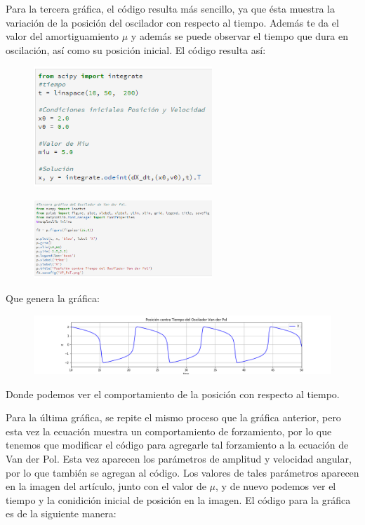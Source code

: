 \documentclass[a4paper]{article}
\begin{document}
\bigskip


Para la tercera gráfica, el código resulta más sencillo, ya que ésta muestra la variación de la posición del oscilador con respecto al tiempo. Además te da el valor del amortiguamiento $\mu$ y además se puede observar el tiempo que dura en oscilación, así como su posición inicial. El código resulta así:

\begin{figure}[ht!]
 \centering
  \includegraphics[width=0.6\textwidth]{Codigo6.PNG}
\end{figure}
\pagebreak
\begin{figure}[ht!]
 \centering
  \includegraphics[width=0.6\textwidth]{Codigo7.PNG}
\end{figure}

Que genera la gráfica:

\begin{figure}[ht!]
 \centering
  \includegraphics[width=\textwidth]{VP_PcT.png}
\end{figure}

Donde podemos ver el comportamiento de la posición con respecto al tiempo. 

\bigskip

Para la última gráfica, se repite el mismo proceso que la gráfica anterior, pero esta vez la ecuación muestra un comportamiento de forzamiento, por lo que tenemos que modificar el código para agregarle tal forzamiento a la ecuación de Van der Pol. Esta vez aparecen los parámetros de amplitud y velocidad angular, por lo que también se agregan al código. Los valores de tales parámetros aparecen en la imagen del artículo, junto con el valor de $\mu$, y de nuevo podemos ver el tiempo y la conidición inicial de posición en la imagen. El código para la gráfica es de la siguiente manera:
\end{document}
